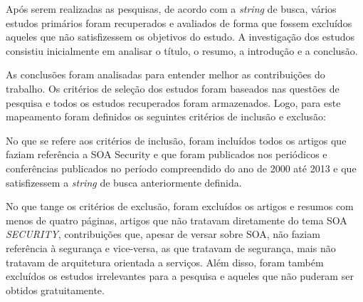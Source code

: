 Após serem realizadas as pesquisas, de acordo com a \emph{string} de busca,  vários estudos primários foram recuperados e avaliados  de forma que fossem  excluídos aqueles que não satisfizessem os objetivos do estudo. A investigação dos estudos consistiu inicialmente em analisar o título, o resumo, a introdução e a conclusão.

As conclusões foram analisadas para entender melhor as contribuições do trabalho. Os critérios de seleção dos estudos foram baseados nas questões de pesquisa e todos os estudos recuperados foram armazenados. Logo, para este mapeamento foram definidos os seguintes critérios de inclusão e exclusão:

No que se refere aos critérios de inclusão, foram incluídos todos os artigos que faziam referência a SOA Security e que foram publicados nos periódicos e conferências publicados no período compreendido do ano de 2000 até 2013 e que satisfizessem a \emph{string} de busca anteriormente definida.

No que tange os critérios de exclusão, foram excluídos os artigos e resumos com menos de quatro páginas, artigos que não tratavam diretamente do tema SOA \emph{SECURITY}, contribuições que, apesar de versar sobre SOA, não faziam referência à segurança e vice-versa, as que tratavam de segurança, mais não tratavam de arquitetura orientada a serviços. Além disso, foram também excluídos os estudos irrelevantes para a pesquisa e aqueles que não puderam ser obtidos gratuitamente.




